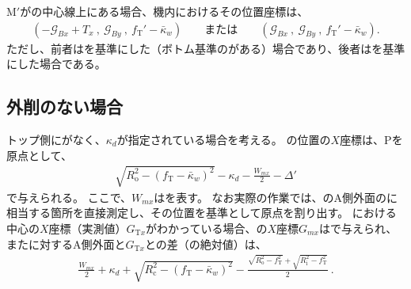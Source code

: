 \clearpage
\KeywayCenter M$'$が\TopOutcutWidth の中心線上にある場合、機内におけるその位置座標は、
\begin{align*}
  \left(
    -\mathcal G_{Bx}+T_x\ ,\
    \mathcal G_{By}\ ,\
    f_\mathrm T'-\bar\kappa_w
  \right) \qquad
  \text{または}\qquad
  \left(
    \mathcal G_{Bx}\ ,\
    \mathcal G_{By}\ ,\
    f_\mathrm T'-\bar\kappa_w
  \right).
\end{align*}
ただし、前者は\BottomOutcut を基準にした（ボトム基準の\CenterlineEndFaceDif がある）場合であり、後者は\TopOutcut を基準にした場合である。





\subsection{外削のない場合}
トップ側に\Outcut がなく、\textbf{\AsideKeywayDepth}$\kappa_d$が指定されている場合を考える。
\KeywayCenter の位置の$X$座標は、\TableCenter Pを原点として、
\begin{align}
  \label{eq:mizocenterA}
  \sqrt{R_\mathrm o^2-(f_\mathrm T-\bar\kappa_w)^2}-\kappa_d-\frac{W_{mx}}2
  -\Delta'
\end{align}
で与えられる。
ここで、$W_{mx}$は\KeywayACOD を表す。
なお実際の作業では、のA側外面の\KeywayCenter に相当する箇所を直接測定し、その位置を基準として原点を割り出す。
\TopEndFace における中心の$X$座標（実測値）$G_{\mathrm Tx}$がわかっている場合、\KeywayCenter の$X$座標$G_{mx}$はで与えられ、また\KeywayCenter に対するA側外面と$G_{\mathrm Tx}$との差（の絶対値）は、
\begin{align}
  \label{eq:mizocenterAd}
  \frac{W_{mx}}2+\kappa_d
  +\sqrt{R_\mathrm c^2-(f_\mathrm T-\bar\kappa_w)^2}
  -\frac{\sqrt{R_\mathrm o^2-f_\mathrm T^2}+\sqrt{R_\mathrm i^2-f_\mathrm T^2}}2\ .
\end{align}


